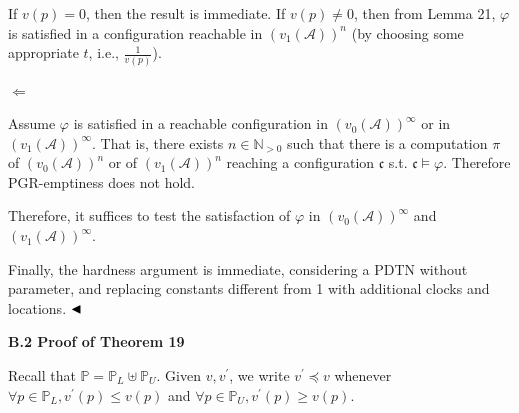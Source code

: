 \documentclass[10pt,a4paper]{article}
\begin{document}
 
 
If $v(p)=0$, then the result is immediate. If $v(p)\neq 0$, then from Lemma 21, $\varphi$ is satisfied in a configuration reachable in ${(v_{1}(\mathcal{A}))}^{n}$ (by choosing some appropriate $t$, i.e., $\frac{1}{v(p)}$).\par
 
  $\Leftarrow$  
 
Assume $\varphi$ is satisfied in a reachable configuration in ${(v_{0}(\mathcal{A}))}^{\infty}$ or in ${(v_{1}(\mathcal{A}))}^{\infty}$. That is, there exists $n\in\mathbb{N}_{>0}$ such that there is a computation $\pi$ of ${(v_{0}(\mathcal{A}))}^{n}$ or of ${(v_{1}(\mathcal{A}))}^{n}$ reaching a configuration $\mathfrak{c}$ s.t. $\mathfrak{c}\models\varphi$. Therefore PGR-emptiness does not hold.\par
 
   
Therefore, it suffices to test the satisfaction of $\varphi$ in ${(v_{0}(\mathcal{A}))}^{\infty}$ and ${(v_{1}(\mathcal{A}))}^{\infty}$.\par
 
 
 
Finally, the hardness argument is immediate, considering a PDTN without parameter, and replacing constants different from 1 with additional clocks and locations. $\hfill\blacktriangleleft$\par
 
 
 
 
 
\par\medskip\noindent\textbf{B.2 Proof of Theorem 19}\par
 
 
Recall that $\mathbb{P}=\mathbb{P}_{L}\uplus\mathbb{P}_{U}$. Given $v,v^{\prime}$, we write $v^{\prime}\preceq v$ whenever $\forall p\in\mathbb{P}_{L},v^{\prime}(p)\leq v(p)$ and $\forall p\in\mathbb{P}_{U},v^{\prime}(p)\geq v(p)$.\par
 
 
 
\end{document}
